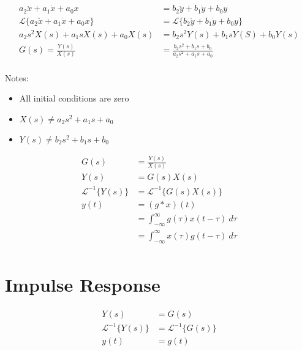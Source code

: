 \documentclass{article}
\begin{document}
    $$\begin{aligned}
        a_2\ddot{x} + a_1\dot{x} + a_0x &= b_2\ddot{y} + b_1\dot{y} + b_0y \\
        \mathscr{L}\{a_2\ddot{x} + a_1\dot{x} + a_0x\} &= \mathscr{L}\{b_2\ddot{y} + b_1\dot{y} + b_0y\} \\
        a_2s^2X(s) + a_1sX(s) + a_0X(s) &= b_2s^2Y(s) + b_1sY(S) + b_0Y(s) \\
        G(s) = \frac{Y(s)}{X(s)} &= \frac{b_2s^2 + b_1s + b_0}{a_2s^2 + a_1s + a_0} \\
    \end{aligned}$$

    Notes: \begin{itemize}
        \item All initial conditions are zero
        \item $X(s) \neq a_2s^2 + a_1s + a_0$
        \item $Y(s) \neq b_2s^2 + b_1s + b_0$
    \end{itemize}

    $$\begin{aligned}
        G(s) &= \frac{Y(s)}{X(s)} \\
        Y(s) &= G(s)X(s) \\
        \mathscr{L}^{-1}\{Y(s)\} &= \mathscr{L}^{-1}\{G(s)X(s)\} \\
        y(t) &= (g * x)(t) \\
        &= \int_{-\infty}^\infty{g(\tau)x(t - \tau)\ d\tau} \\
        &= \int_{-\infty}^\infty{x(\tau)g(t - \tau)\ d\tau} \\
    \end{aligned}$$

    \section{Impulse Response}

    $$\begin{aligned}
        Y(s) &= G(s) \\
        \mathscr{L}^{-1}\{Y(s)\} &= \mathscr{L}^{-1}\{G(s)\} \\
        y(t) &= g(t)
    \end{aligned}$$
\end{document}
